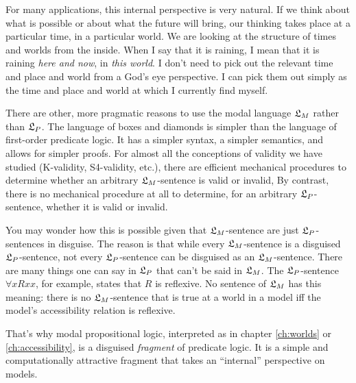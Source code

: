 For many applications, this internal perspective is very natural. If we think
about what is possible or about what the future will bring, our thinking takes
place at a particular time, in a particular world. We are looking at the
structure of times and worlds from the inside. When I say that it is raining, I
mean that it is raining \emph{here and now}, in \emph{this world}. I don't need
to pick out the relevant time and place and world from a God's eye perspective.
I can pick them out simply as the time and place and world at which I currently
find myself.

There are other, more pragmatic reasons to use the modal language $\mathfrak{L}_M$ rather
than $\mathfrak{L}_P$. The language of boxes and diamonds is simpler than the language of
first-order predicate logic. It has a simpler syntax, a simpler semantics, and
allows for simpler proofs. For almost all the conceptions of validity we have
studied (K-validity, S4-validity, etc.), there are efficient mechanical
procedures to determine whether an arbitrary $\mathfrak{L}_M$-sentence is valid or
invalid, By contrast, there is no mechanical procedure at all to determine, for
an arbitrary $\mathfrak{L}_P$-sentence, whether it is valid or invalid.

You may wonder how this is possible given that $\mathfrak{L}_M$-sentence are just
$\mathfrak{L}_P$-sentences in disguise. The reason is that while every $\mathfrak{L}_M$-sentence is
a disguised $\mathfrak{L}_P$-sentence, not every $\mathfrak{L}_P$-sentence can be disguised as an
$\mathfrak{L}_M$-sentence. There are many things one can say in $\mathfrak{L}_P$ that can't be said
in $\mathfrak{L}_M$. The $\mathfrak{L}_{P}$-sentence $\forall x Rxx$, for example, states that $R$
is reflexive. No sentence of $\mathfrak{L}_M$ has this meaning: there is no
$\mathfrak{L}_{M}$-sentence that is true at a world in a model iff the model's
accessibility relation is reflexive.

That's why modal propositional logic, interpreted as in chapter \ref{ch:worlds}
or \ref{ch:accessibility}, is a disguised \emph{fragment} of predicate logic. It
is a simple and computationally attractive fragment that takes an ``internal''
perspective on models.

